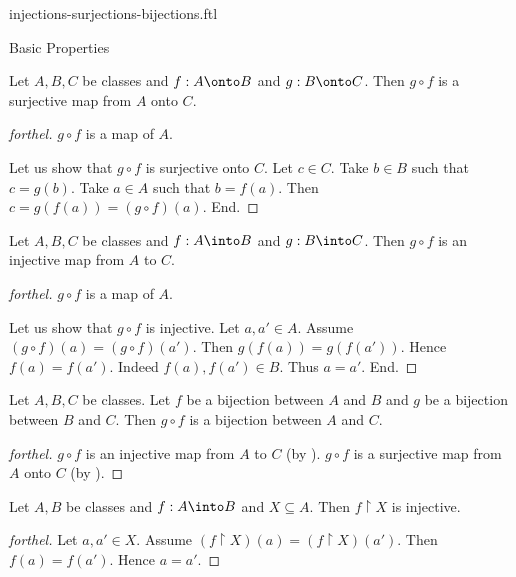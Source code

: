 \documentclass{naproche-library}
\begin{document}
\begin{smodule}[title={Injective, Surjective and Bijective Maps}]{injections-surjections-bijections.ftl}
\begin{sfragment}{Basic Properties}
  \begin{proposition}[forthel,id=FOUNDATIONS_08_8542698338254848]
    Let $A, B, C$ be classes and $f : A \onto B$ and $g : B \onto C$.
    Then $g \circ f$ is a surjective map from $A$ onto $C$.
  \end{proposition}
  \begin{proof}[forthel]
    $g \circ f$ is a map of $A$.

    Let us show that $g \circ f$ is surjective onto $C$.
      Let $c \in C$.
      Take $b \in B$ such that $c = g(b)$.
      Take $a \in A$ such that $b = f(a)$.
      Then $c = g(f(a)) = (g \circ f)(a)$.
    End.
  \end{proof}

  \begin{proposition}[forthel,id=FOUNDATIONS_08_3367836856614912]
    Let $A, B, C$ be classes and $f : A \into B$ and $g : B \into C$.
    Then $g \circ f$ is an injective map from $A$ to $C$.
  \end{proposition}
  \begin{proof}[forthel]
    $g \circ f$ is a map of $A$.

    Let us show that $g \circ f$ is injective.
      Let $a, a' \in A$.
      Assume $(g \circ f)(a) = (g \circ f)(a')$.
      Then $g(f(a)) = g(f(a'))$.
      Hence $f(a) = f(a')$.
      Indeed $f(a), f(a') \in B$.
      Thus $a = a'$.
    End.
  \end{proof}

  \begin{corollary}[forthel,id=FOUNDATIONS_08_6435206693126144]
    Let $A, B, C$ be classes.
    Let $f$ be a bijection between $A$ and $B$ and $g$ be a bijection between $B$ and $C$.
    Then $g \circ f$ is a bijection between $A$ and $C$.
  \end{corollary}
  \begin{proof}[forthel]
    $g \circ f$ is an injective map from $A$ to $C$ (by ).
    $g \circ f$ is a surjective map from $A$ onto $C$ (by ).
  \end{proof}

  \begin{proposition}[forthel,id=FOUNDATIONS_08_2621531811217408]
    Let $A, B$ be classes and $f : A \into B$ and $X \subseteq A$.
    Then $f \restriction X$ is injective.
  \end{proposition}
  \begin{proof}[forthel]
    Let $a, a' \in X$.
    Assume $(f \restriction X)(a) = (f \restriction X)(a')$.
    Then $f(a) = f(a')$.
    Hence $a = a'$.
  \end{proof}


\end{sfragment}
\end{smodule}
\end{document}
